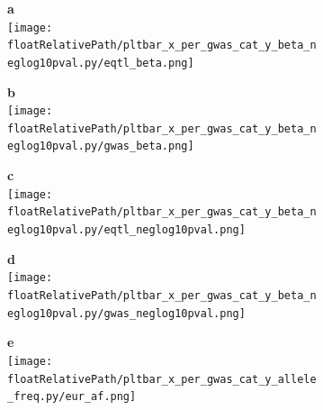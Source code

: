 \begin{figure}[!ht]

    \begin{subfigure}[]{.49\textwidth}
        \textbf{a}
        \\
        \texttt{[image: \\floatRelativePath/pltbar\_x\_per\_gwas\_cat\_y\_beta\_neglog10pval.py/eqtl\_beta.png]}
    \end{subfigure}
    \begin{subfigure}[]{.49\textwidth}
        \textbf{b}
        \\
        \texttt{[image: \\floatRelativePath/pltbar\_x\_per\_gwas\_cat\_y\_beta\_neglog10pval.py/gwas\_beta.png]}
    \end{subfigure}

    \begin{subfigure}[]{.49\textwidth}
        \textbf{c}
        \\
        \texttt{[image: \\floatRelativePath/pltbar\_x\_per\_gwas\_cat\_y\_beta\_neglog10pval.py/eqtl\_neglog10pval.png]}
    \end{subfigure}
    \begin{subfigure}[]{.49\textwidth}
        \textbf{d}
        \\
        \texttt{[image: \\floatRelativePath/pltbar\_x\_per\_gwas\_cat\_y\_beta\_neglog10pval.py/gwas\_neglog10pval.png]}
    \end{subfigure}

    \centering
    \begin{subfigure}[]{.49\textwidth}
        \textbf{e}
        \\
        \texttt{[image: \\floatRelativePath/pltbar\_x\_per\_gwas\_cat\_y\_allele\_freq.py/eur\_af.png]}
    \end{subfigure}

    \caption{}

\end{figure}

%
%

